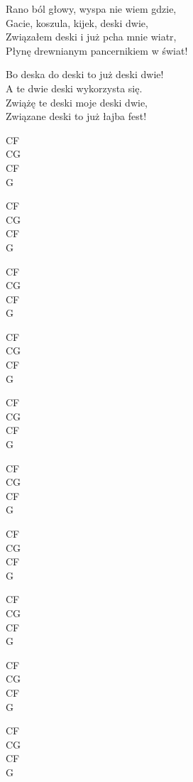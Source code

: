 \begin{text}
    Rano ból głowy, wyspa nie wiem gdzie,\\
    Gacie, koszula, kijek, deski dwie,\\
    Związałem deski i już pcha mnie wiatr,\\
    Płynę drewnianym pancernikiem w świat!

    \vin Bo deska do deski to już deski dwie!\\
    \vin A te dwie deski wykorzysta się.\\
    \vin Zwiążę te deski moje deski dwie,\\
    \vin Związane deski to już łajba fest!

\end{text}
\begin{chord}
    CF\\
    CG\\
    CF\\
    G

    CF\\
    CG\\
    CF\\
    G

    CF\\
    CG\\
    CF\\
    G

    CF\\
    CG\\
    CF\\
    G

    CF\\
    CG\\
    CF\\
    G

    CF\\
    CG\\
    CF\\
    G

    CF\\
    CG\\
    CF\\
    G

    CF\\
    CG\\
    CF\\
    G

    CF\\
    CG\\
    CF\\
    G

    CF\\
    CG\\
    CF\\
    G

\end{chord}